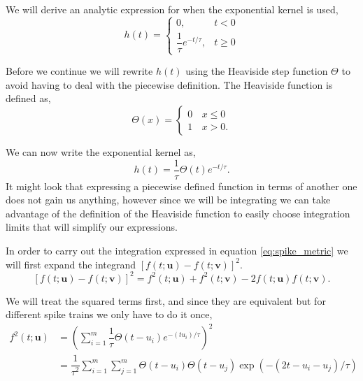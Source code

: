 \documentclass[10pt,a4paper]{book}
\begin{document}
We will derive an analytic expression for when the exponential kernel is used,
\begin{equation}
h(t) = \left\{
\begin{matrix}
0, & t < 0 \\
\dfrac{1}{\tau} e^{-t/\tau}, & t \ge 0
\end{matrix}
\right.
\end{equation}

Before we continue we will rewrite $h(t)$ using the Heaviside step function $\Theta$ to avoid having to deal with the piecewise definition. The Heaviside function is defined as,
\begin{equation}
\Theta(x) = 
\left\lbrace
\begin{matrix}
0\, & x \leq 0 \\
1\, & x > 0.
\end{matrix}
\right.
\end{equation}

We can now write the exponential kernel as,
\begin{equation}
h(t)= \dfrac{1}{\tau}\Theta(t)e^{-t/\tau}.
\end{equation}
It might look that expressing a piecewise defined function in terms of another one does not gain us anything, however since we will be integrating we can take advantage of the definition of the Heaviside function to easily choose integration limits that will simplify our expressions.

In order to carry out the integration expressed in equation \ref{eq:spike_metric} we will first expand the integrand $\left[f(t; \mathbf{u}) - f(t;\mathbf{v}) \right]^2$.
\begin{equation}
\left[f(t; \mathbf{u}) - f(t;\mathbf{v}) \right]^2 = f^2(t; \mathbf{u}) + f^2(t; \mathbf{v}) - 2f(t; \mathbf{u})f(t; \mathbf{v}).
\end{equation}




We will treat the squared terms first, and since they are equivalent but for different spike trains we only have to do it once,
\begin{align}
f^2(t; \mathbf{u}) %
&= \left( \sum_{i=1}^{m}\dfrac{1}{\tau}\Theta(t - u_i)e^{-(t u_i)/\tau} \right)^2 \nonumber \\
&= \dfrac{1}{\tau^2} \sum_{i=1}^{m}\sum_{j=1}^{m} \Theta(t - u_i)  \Theta(t - u_j) \exp(-(2t -u_i -u_j)/\tau)
\end{align} 
\end{document}
